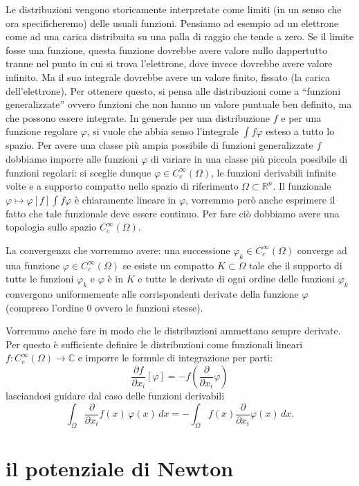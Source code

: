 \documentclass[italian,a4paper,oneside,headinclude]{scrbook}
\renewcommand{\phi}{\varphi}
\newcommand{\CC}{\mathbb C}
\newcommand{\RR}{\mathbb R}
\begin{document}
Le distribuzioni vengono storicamente interpretate come limiti (in un
senso che ora specificheremo) delle usuali funzioni. Pensiamo ad
esempio ad un elettrone come ad una carica distribuita su una palla di
raggio che tende a zero. Se il limite fosse una funzione, questa
funzione dovrebbe avere valore nullo dappertutto tranne nel punto in
cui si trova l'elettrone, dove invece dovrebbe avere valore
infinito. Ma il suo integrale dovrebbe avere un valore finito, fissato
(la carica dell'elettrone). Per ottenere questo, si pensa alle
distribuzioni come a ``funzioni generalizzate'' ovvero funzioni che
non hanno un valore puntuale ben definito, ma che possono essere
integrate. In generale per una distribuzione $f$ e per una funzione
regolare $\phi$, si vuole che abbia senso l'integrale $\int f\phi$
esteso a tutto lo spazio. Per avere una classe più ampia possibile di
funzioni generalizzate $f$ dobbiamo imporre alle funzioni $\phi$ di
variare in una classe più piccola possibile di funzioni regolari: si
sceglie dunque $\phi \in C_c^\infty(\Omega)$, le funzioni derivabili
infinite volte e a supporto compatto nello spazio di riferimento
$\Omega\subset \RR^n$. Il funzionale $\phi \mapsto \phi[f]\int f\phi$ è
chiaramente lineare in $\phi$, vorremmo però anche esprimere il fatto
che tale funzionale deve essere continuo. Per fare ciò
dobbiamo avere una topologia sullo spazio $C_c^\infty(\Omega)$.

La convergenza che vorremmo avere:
una successione $\phi_k\in C_c^\infty(\Omega)$
converge ad una funzione $\phi\in C_c^\infty(\Omega)$ se esiste un
compatto $K\subset \Omega$ tale che il supporto di tutte le funzioni
$\phi_k$ e $\phi$ è in $K$ e tutte le derivate di ogni ordine delle
funzioni $\phi_k$ convergono uniformemente alle corrispondenti
derivate della funzione $\phi$ (compreso l'ordine $0$ ovvero le
funzioni stesse).

Vorremmo anche fare in modo che le distribuzioni ammettano sempre
derivate. Per questo è sufficiente definire le distribuzioni come
funzionali lineari $f\colon C_c^\infty(\Omega)\to \CC$ e imporre le
formule di integrazione per parti:
\[
\frac{\partial f}{\partial x_i} [\phi] = -f\left(\frac{\partial}{\partial x_i}\phi\right)
\]
lasciandosi guidare dal caso delle funzioni derivabili
\[
\int_\Omega \frac{\partial}{\partial x_i}f(x)\, \phi(x)\, dx
= - \int_\Omega f(x) \frac{\partial}{\partial x_i}\phi(x)\, dx.
\]

\section{il potenziale di Newton}
\end{document}
